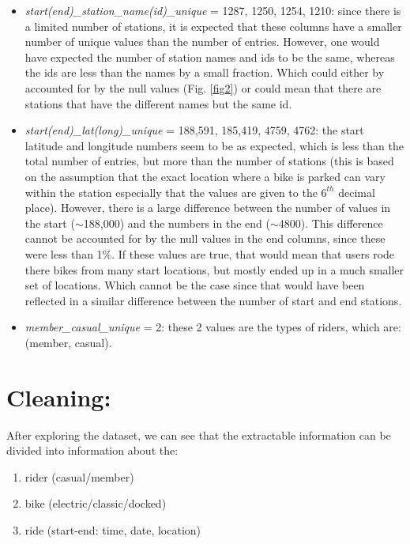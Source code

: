 \documentclass[12pt]{article}
\begin{document}
\begin{itemize}
\begin{itemize}
	\item \textit{start(end)\_station\_name(id)\_unique} = 1287, 1250, 1254, 1210: since there is a limited number of stations, it is expected that these columns have a smaller number of unique values than the number of entries. However, one would have expected the number of station names and ids to be the same, whereas the ids are less than the names by a small fraction. Which could either by accounted for by the null values (Fig. \ref{fig2}) or could mean that there are stations that have the different names but the same id.
	\item \textit{start(end)\_lat(long)\_unique} = 188,591, 185,419, 4759, 4762: the start latitude and longitude numbers seem to be as expected, which is less than the total number of entries, but more than the number of stations (this is based on the assumption that the exact location where a bike is parked can vary within the station especially that the values are given to the $6^{th}$ decimal place). However, there is a large difference between the number of values in the start ($\sim$188,000) and the numbers in the end ($\sim$4800). This difference cannot be accounted for by the null values in the end columns, since these were less than 1\%. If these values are true, that would mean that users rode there bikes from many start locations, but mostly ended up in a much smaller set of locations. Which cannot be the case since that would have been reflected in a similar difference between the number of start and end stations. 
	\item \textit{member\_casual\_unique} = 2: these 2 values are the types of riders, which are: \Big(member, casual\Big).
	\end{itemize}
\end{itemize}
	
\section*{Cleaning:}
After exploring the dataset, we can see that the extractable information can be divided into information about the:
	\begin{enumerate} 
	\item rider (casual/member)
	\item bike (electric/classic/docked)
	\item ride (start-end: time, date, location)
	\end{enumerate}
	
\end{document}
